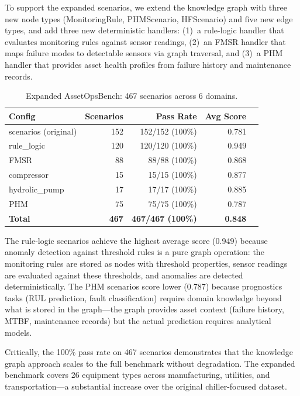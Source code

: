 \documentclass[11pt]{article}
\begin{document}
To support the expanded scenarios, we extend the knowledge graph with three new node types (MonitoringRule, PHMScenario, HFScenario) and five new edge types, and add three new deterministic handlers: (1)~a rule-logic handler that evaluates monitoring rules against sensor readings, (2)~an FMSR handler that maps failure modes to detectable sensors via graph traversal, and (3)~a PHM handler that provides asset health profiles from failure history and maintenance records.

\begin{table}[t]
  \centering
  \caption{Expanded AssetOpsBench: 467 scenarios across 6 domains.}
  \label{tab:hf-results}
  \begin{tabular}{@{}lrrrr@{}}
    \toprule
    \textbf{Config} & \textbf{Scenarios} & \textbf{Pass Rate} & \textbf{Avg Score} \\
    \midrule
    scenarios (original)   & 152 & 152/152 (100\%) & 0.781 \\
    rule\_logic            & 120 & 120/120 (100\%) & 0.949 \\
    FMSR                   & 88  & 88/88 (100\%)   & 0.868 \\
    compressor             & 15  & 15/15 (100\%)   & 0.877 \\
    hydrolic\_pump         & 17  & 17/17 (100\%)   & 0.885 \\
    PHM                    & 75  & 75/75 (100\%)   & 0.787 \\
    \midrule
    \textbf{Total}         & \textbf{467} & \textbf{467/467 (100\%)} & \textbf{0.848} \\
    \bottomrule
  \end{tabular}
\end{table}

The rule-logic scenarios achieve the highest average score (0.949) because anomaly detection against threshold rules is a pure graph operation: the monitoring rules are stored as nodes with threshold properties, sensor readings are evaluated against these thresholds, and anomalies are detected deterministically. The PHM scenarios score lower (0.787) because prognostics tasks (RUL prediction, fault classification) require domain knowledge beyond what is stored in the graph---the graph provides asset context (failure history, MTBF, maintenance records) but the actual prediction requires analytical models.

Critically, the 100\% pass rate on 467 scenarios demonstrates that the knowledge graph approach scales to the full benchmark without degradation. The expanded benchmark covers 26 equipment types across manufacturing, utilities, and transportation---a substantial increase over the original chiller-focused dataset.
\end{document}
